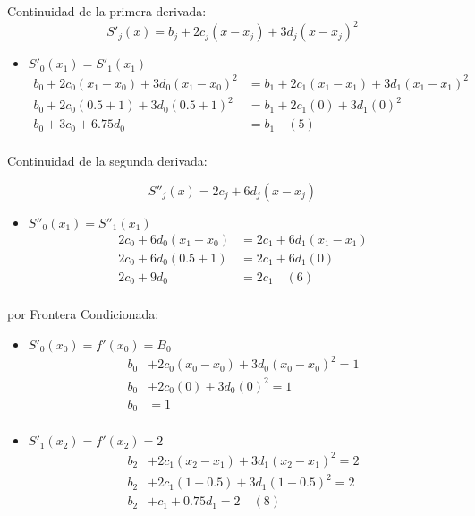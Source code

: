 \documentclass[12pt]{article}
\begin{document}
\begin{enumerate}
    Continuidad de la primera derivada:
        \[S'_j(x) = b_j + 2c_j(x - x_j) + 3d_j(x - x_j)^2\]
        
        \begin{itemize}
            \item $S'_0(x_1) =  S'_1(x_1)$
            \[
            \begin{aligned}
            b_0 + 2c_0(x_1 - x_0) + 3d_0(x_1 - x_0)^2 &= b_1 + 2c_1(x_1 - x_1) + 3d_1(x_1 - x_1)^2 \\
            b_0 + 2c_0(0.5+1) + 3d_0(0.5+1)^2 &= b_1 + 2c_1(0) + 3d_1(0)^2 \\
            b_0 + 3c_0 + 6.75d_0 &= b_1 \quad (5) \\
            \end{aligned}
            \]
        \end{itemize}

        Continuidad de la segunda derivada:

        \[S''_j(x) = 2c_j + 6d_j(x -x_j)\]
        
        \begin{itemize}
            \item $S''_0(x_1) = S''_1(x_1)$
            \[
            \begin{aligned}
            2c_0 + 6d_0(x_1 -x_0) &= 2c_1 + 6d_1(x_1 -x_1) \\     
            2c_0 + 6d_0(0.5+1) &= 2c_1 + 6d_1(0) \\     
            2c_0 + 9d_0 &= 2c_1 \quad (6) \\     
            \end{aligned}
            \]
        \end{itemize}

        por Frontera Condicionada:
        \begin{itemize}
            \item $S'_0(x_0) = f'(x_0) = B_0$
            \[
            \begin{aligned}
                b_0 &+ 2c_0(x_0-x_0) + 3d_0 (x_0 - x_0)^2 = 1\\
                b_0 &+ 2c_0(0) + 3d_0 (0)^2 = 1\\
                b_0 &= 1\\
            \end{aligned}
            \]
            \item $S'_1(x_2) = f'(x_2) = 2$
            \[
            \begin{aligned}
                b_2 &+ 2c_1 (x_2 - x_1) + 3d_1(x_2 - x_1)^2 = 2 \\
                b_2 &+ 2c_1 (1-0.5) + 3d_1(1-0.5)^2 = 2 \\
                b_2 &+ c_1 + 0.75d_1 = 2 \quad (8) \\
            \end{aligned}
            \]
        \end{itemize}


\end{enumerate}
\end{document}
